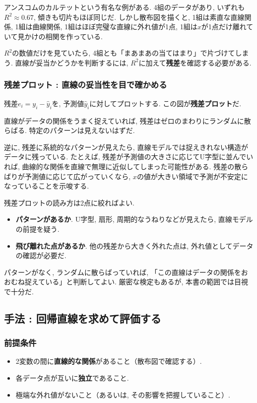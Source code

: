 アンスコムのカルテットという有名な例がある.
4組のデータがあり, いずれも$R^2 \approx 0.67$, 傾きも切片もほぼ同じだ.
しかし散布図を描くと, 1組は素直な直線関係, 1組は曲線関係, 1組はほぼ完璧な直線に外れ値が1点, 1組は$x$が1点だけ離れていて見かけの相関を作っている.


$R^2$の数値だけを見ていたら, 4組とも「まあまあの当てはまり」で片づけてしまう.
直線が妥当かどうかを判断するには, $R^2$に加えて\textbf{残差}を確認する必要がある.

\subsubsection*{残差プロット : 直線の妥当性を目で確かめる}

残差$e_i = y_i - \hat{y}_i$を, 予測値$\hat{y}_i$に対してプロットする.
この図が\textbf{残差プロット}だ.

直線がデータの関係をうまく捉えていれば, 残差はゼロのまわりにランダムに散らばる.
特定のパターンは見えないはずだ.

逆に, 残差に系統的なパターンが見えたら, 直線モデルでは捉えきれない構造がデータに残っている.
たとえば, 残差が予測値の大きさに応じてU字型に並んでいれば, 曲線的な関係を直線で無理に近似してしまった可能性がある.
残差の散らばりが予測値に応じて広がっていくなら, $x$の値が大きい領域で予測が不安定になっていることを示唆する.

残差プロットの読み方は2点に絞ればよい.
\begin{itemize}
  \item \textbf{パターンがあるか}. U字型, 扇形, 周期的なうねりなどが見えたら, 直線モデルの前提を疑う.
  \item \textbf{飛び離れた点があるか}. 他の残差から大きく外れた点は, 外れ値としてデータの確認が必要だ.
\end{itemize}

パターンがなく, ランダムに散らばっていれば, 「この直線はデータの関係をおおむね捉えている」と判断してよい.
厳密な検定もあるが, 本書の範囲では目視で十分だ.


\subsection{手法 : 回帰直線を求めて評価する}

\subsubsection*{前提条件}
\begin{itemize}
  \item 2変数の間に\textbf{直線的な関係}があること（散布図で確認する）.
  \item 各データ点が互いに\textbf{独立}であること.
  \item 極端な外れ値がないこと（あるいは, その影響を把握していること）.
\end{itemize}

